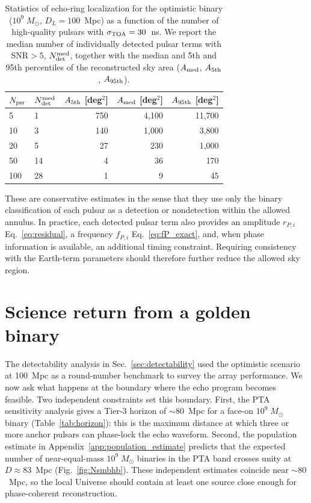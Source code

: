 \documentclass[aps,prx,twocolumn,superscriptaddress,nofootinbib,longbibliography]{revtex4-2}
\newcommand{\Msun}{M_\odot}
\begin{document}
\begin{table}[t]
\caption{Statistics of echo-ring localization for the optimistic binary ($10^9\;\Msun$, $D_L=100$~Mpc) as a function of the number of high-quality pulsars with $\sigma_{\rm TOA}=30$~ns. We report the median number of individually detected pulsar terms with SNR$>5$, $N_{\rm det}^{\rm med}$, together with the median and 5th and 95th percentiles of the reconstructed sky area ($A_{\rm med}$, $A_{\rm 5th}$, $A_{\rm 95th}$).}\label{tab:skyloc}
\centering
\setlength{\tabcolsep}{3pt}
\begin{tabular}{llrrr}
\hline\hline
$N_{\rm psr}$ & $N_{\rm det}^{\rm med}$ & $A_{\rm 5th}$ [deg$^2$] & $A_{\rm med}$ [deg$^2$] & $A_{\rm 95th}$ [deg$^2$] \\
\hline
5   & 1  & 750 & 4,100 & 11,700 \\
10  & 3  & 140 & 1,000 & 3,800 \\
20  & 5  & 27  & 230   & 1,000 \\
50  & 14 & 4   & 36    & 170 \\
100 & 28 & 1   & 9     & 45 \\
\hline\hline
\end{tabular}
\end{table}

These are conservative estimates in the sense that they use only the binary classification of each pulsar as a detection or nondetection within the allowed annulus. In practice, each detected pulsar term also provides an amplitude $r_{P,i}$ Eq.~\eqref{eq:residual}, a frequency $f_{P,i}$ Eq.~\eqref{eq:fP_exact}, and, when phase information is available, an additional timing constraint. Requiring consistency with the Earth-term parameters should therefore further reduce the allowed sky region.

\section{Science return from a golden binary}\label{sec:science}

The detectability analysis in Sec.~\ref{sec:detectability} used the optimistic scenario at 100~Mpc as a round-number benchmark to survey the array performance. We now ask what happens at the boundary where the echo program becomes feasible. Two independent constraints set this boundary. First, the PTA sensitivity analysis gives a Tier-3 horizon of $\sim80$~Mpc for a face-on $10^9\;\Msun$ binary (Table~\ref{tab:horizon}): this is the maximum distance at which three or more anchor pulsars can phase-lock the echo waveform. Second, the population estimate in Appendix~\ref{app:population_estimate} predicts that the expected number of near-equal-mass $10^9\;\Msun$ binaries in the PTA band crosses unity at $D\approx83$~Mpc (Fig.~\ref{fig:Nsmbhb}). These independent estimates coincide near $\sim80$~Mpc, so the local Universe should contain at least one source close enough for phase-coherent reconstruction.
\end{document}
